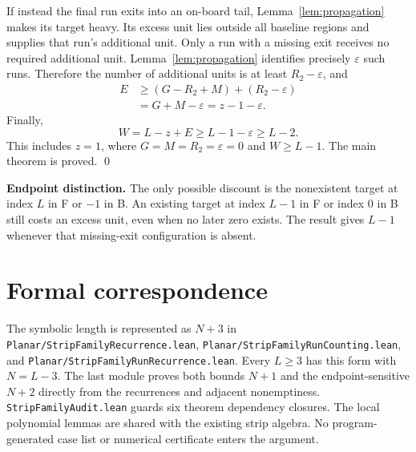 \documentclass{article}
\begin{document}
If instead the final run exits into an on-board tail, Lemma~\ref{lem:propagation} makes its
target heavy. Its excess unit lies outside all baseline regions and supplies that run's
additional unit. Only a run with a missing exit receives no required additional unit.
Lemma~\ref{lem:propagation} identifies precisely \(\varepsilon\) such runs. Therefore the number
of additional units is at least \(R_2 - \varepsilon\), and
\begin{equation}
  \begin{aligned}
    E &\ge (G - R_2 + M) + (R_2 - \varepsilon) \\
      &= G + M - \varepsilon = z - 1 - \varepsilon.
  \end{aligned}
\end{equation}
Finally,
\begin{equation}
  W = L - z + E \ge L-1 - \varepsilon \ge L-2.
\end{equation}
This includes \(z = 1\), where \(G = M = R_2 = \varepsilon = 0\) and \(W \ge L-1\). The main
theorem is proved. \qed

\textbf{Endpoint distinction.} The only possible discount is the nonexistent target at index \(L\)
in F or \(-1\) in B. An existing target at index \(L-1\) in F or index 0 in B still costs an excess
unit, even when no later zero exists. The result gives \(L-1\) whenever that missing-exit
configuration is absent.

\section{Formal correspondence}
The symbolic length is represented as \(N+3\) in
\texttt{Planar/StripFamilyRecurrence.lean},
\texttt{Planar/StripFamilyRunCounting.lean}, and
\texttt{Planar/StripFamilyRunRecurrence.lean}.
Every \(L\ge3\) has this form with \(N=L-3\).
The last module proves both bounds \(N+1\) and the endpoint-sensitive
\(N+2\) directly from the recurrences and adjacent nonemptiness.
\texttt{StripFamilyAudit.lean} guards six theorem dependency closures.
The local polynomial lemmas are shared with the existing strip algebra.
No program-generated case list or numerical certificate enters the argument.
\end{document}
